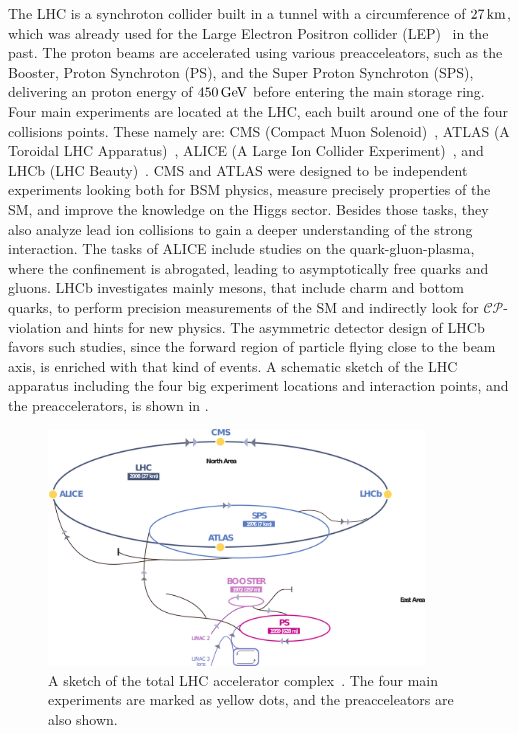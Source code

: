 The LHC is a synchroton collider built in a tunnel with a circumference of $27\,\text{km}$, which was already used for the Large Electron Positron collider (LEP)~\cite{LEPCollider} in the past. The proton beams are accelerated using various preacceleators, such as the Booster, Proton Synchroton (PS), and the Super Proton Synchroton (SPS), delivering an proton energy of $450\,\text{Ge\hspace{-.08em}V}$ before entering the main storage ring. Four main experiments are located at the LHC, each built around one of the four collisions points. These namely are: CMS (Compact Muon Solenoid)~\cite{CMS}, ATLAS (A Toroidal LHC Apparatus)~\cite{ATLAS}, ALICE (A Large Ion Collider Experiment)~\cite{ALICE}, and LHCb (LHC Beauty)~\cite{LHCb}. CMS and ATLAS were designed to be independent experiments looking both for BSM physics, measure precisely properties of the SM, and improve the knowledge on the Higgs sector. Besides those tasks, they also analyze lead ion collisions to gain a deeper understanding of the strong interaction. The tasks of ALICE include studies on the quark-gluon-plasma, where the confinement is abrogated, leading to asymptotically free quarks and gluons. LHCb investigates mainly mesons, that include charm and bottom quarks, to perform precision measurements of the SM and indirectly look for $\mathcal{CP}$-violation and hints for new physics. The asymmetric detector design of LHCb favors such studies, since the forward region of particle flying close to the beam axis, is enriched with that kind of events. A schematic sketch of the LHC apparatus including the four big experiment locations and interaction points, and the preaccelerators, is shown in .\\
\begin{figure}[hbtp]
 \centering
 \includegraphics[width=0.89\textwidth]{figures/general/LHC}
 \caption{A sketch of the total LHC accelerator complex~\cite{LHCPicture}. The four main experiments are marked as yellow dots, and the preacceleators are also shown.}
 \label{fig:LHC}
\end{figure}
